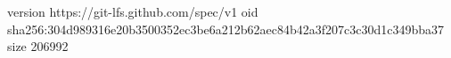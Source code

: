 version https://git-lfs.github.com/spec/v1
oid sha256:304d989316e20b3500352ec3be6a212b62aec84b42a3f207c3c30d1c349bba37
size 206992
